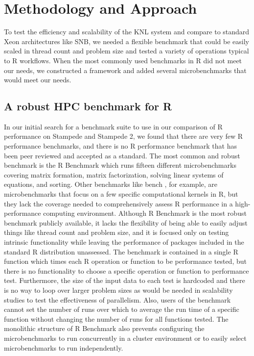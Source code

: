 \section{Methodology and Approach}\label{sec:methodology}

To test the efficiency and scalability of the KNL system and compare to standard Xeon
architectures like SNB, we needed a flexible benchmark that could be easily scaled in
thread count and problem size and tested a variety of operations typical to R workflows.
When the most commonly used benchmarks in R did not meet our needs, we constructed a
framework and added several microbenchmarks that would meet our needs.

\subsection{A robust HPC benchmark for R} \label{sec:hpcBenchmark}

In our initial search for a benchmark suite to use in our comparison of R performance on
Stampede and Stampede 2, we found that there are very few R performance benchmarks, and
there is no R performance benchmark that has been peer reviewed and accepted as a
standard. The most common and robust benchmark is the R Benchmark
\cite{urbanek:Rbenchmarks} which runs fifteen different microbenchmarks covering matrix
formation, matrix factorization, solving linear systems of equations, and sorting. Other
benchmarks like bench \cite{urbanek:Rbenchmarks}, for example, are microbenchmarks that
focus on a few specific computational kernels in R, but they lack the coverage needed to
comprehensively assess R performance in a high-performance computing environment. Although
R Benchmark is the most robust benchmark publicly available, it lacks the flexibility of
being able to easily adjust things like thread count and problem size, and it is focused
only on testing intrinsic functionality while leaving the performance of packages included
in the standard R distribution unassessed.  The benchmark is contained in a single R
function which times each R operation or function to be performance tested, but there is
no functionality to choose a specific operation or function to performance test.
Furthermore, the size of the input data to each test is hardcoded and there is no way to
loop over larger problem sizes as would be needed in scalability studies to test the
effectiveness of parallelism. Also, users of the benchmark cannot set the number of runs
over which to average the run time of a specific function without changing the number of
runs for all functions tested. The monolithic structure of R Benchmark also prevents
configuring the microbenchmarks to run concurrently in a cluster environment or to easily
select microbenchmarks to run independently.


